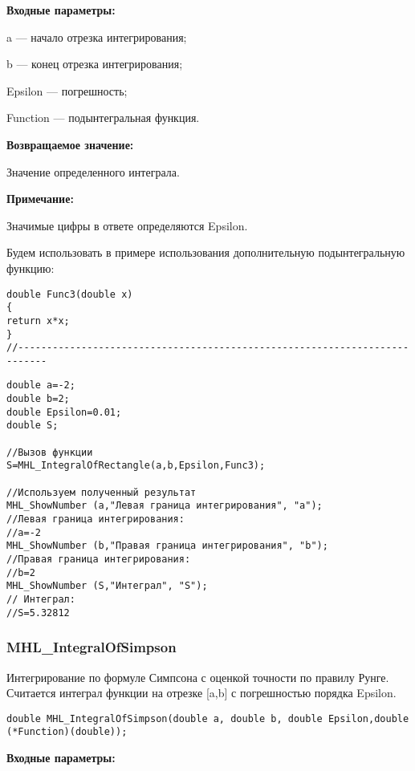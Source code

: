 \documentclass[a4paper,12pt]{article}
\begin{document}
\textbf{Входные параметры:}

 a --- начало отрезка интегрирования;
 
 b --- конец отрезка интегрирования;
 
 Epsilon --- погрешность;
 
 Function --- подынтегральная функция.

\textbf{Возвращаемое значение:}
 
 Значение определенного интеграла.
 
 \textbf{Примечание:}
 
 Значимые цифры в ответе определяются Epsilon.

Будем использовать в примере использования дополнительную подынтегральную функцию:

\begin{lstlisting}[caption=Дополнительная функция]
double Func3(double x)
{
return x*x;
}
//---------------------------------------------------------------------------
\end{lstlisting}


\begin{lstlisting}[label=code_use_MHL_IntegralOfRectangle,caption=Пример использования]
double a=-2;
double b=2;
double Epsilon=0.01;
double S;

//Вызов функции
S=MHL_IntegralOfRectangle(a,b,Epsilon,Func3);

//Используем полученный результат
MHL_ShowNumber (a,"Левая граница интегрирования", "a");
//Левая граница интегрирования:
//a=-2
MHL_ShowNumber (b,"Правая граница интегрирования", "b");
//Правая граница интегрирования:
//b=2
MHL_ShowNumber (S,"Интеграл", "S");
// Интеграл:
//S=5.32812
\end{lstlisting}

\subsubsection{MHL\_IntegralOfSimpson}\label{MHL_IntegralOfSimpson}

Интегрирование по формуле Симпсона с оценкой точности по правилу Рунге. Считается интеграл функции на отрезке [a,b] с погрешностью порядка Epsilon.


\begin{lstlisting}[label=code_syntax_MHL_IntegralOfSimpson,caption=Синтаксис]
double MHL_IntegralOfSimpson(double a, double b, double Epsilon,double (*Function)(double));
\end{lstlisting}

\textbf{Входные параметры:}
\end{document}
